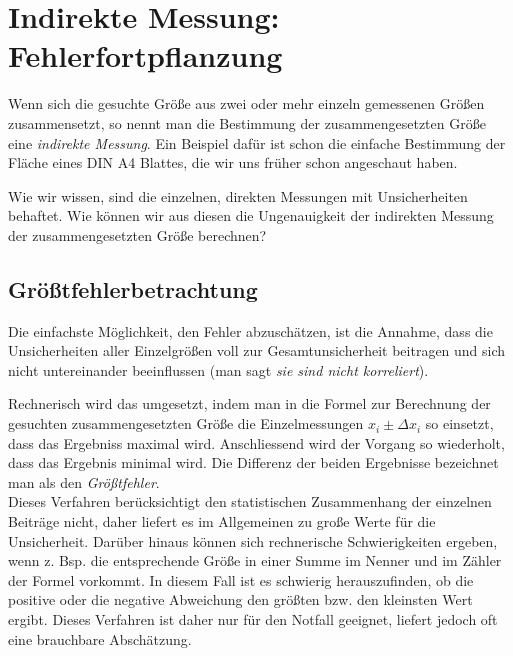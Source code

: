\section{Indirekte Messung: Fehlerfortpflanzung}

Wenn sich die gesuchte Größe aus zwei oder mehr einzeln gemessenen Größen zusammensetzt, so nennt man die Bestimmung der zusammengesetzten Größe eine \textit{indirekte Messung}. Ein Beispiel dafür ist schon die einfache Bestimmung der Fläche eines DIN A4 Blattes, die wir uns früher schon angeschaut haben.

Wie wir wissen, sind die einzelnen, direkten Messungen mit Unsicherheiten behaftet. Wie können wir aus diesen die Ungenauigkeit der indirekten Messung der zusammengesetzten Größe berechnen?

\subsection{Größtfehlerbetrachtung}

Die einfachste Möglichkeit, den Fehler abzuschätzen, ist die Annahme, dass die Unsicherheiten aller Einzelgrößen voll zur Gesamtunsicherheit beitragen und sich nicht untereinander beeinflussen (man sagt \textit{sie sind nicht korreliert}).

Rechnerisch wird das umgesetzt, indem man in die Formel zur Berechnung der gesuchten zusammengesetzten Größe die Einzelmessungen $x_i \pm \Delta x_i$ so einsetzt, dass das Ergebniss maximal wird. Anschliessend wird der Vorgang so wiederholt, dass das Ergebnis minimal wird. Die Differenz der beiden Ergebnisse bezeichnet man als den \textit{Größtfehler}.\\

Dieses Verfahren berücksichtigt den statistischen Zusammenhang der einzelnen Beiträge nicht, daher liefert es im Allgemeinen zu große Werte für die Unsicherheit. Darüber hinaus können sich rechnerische Schwierigkeiten ergeben, wenn z. Bsp. die entsprechende Größe in einer Summe im Nenner und im Zähler der Formel vorkommt. In diesem Fall ist es schwierig herauszufinden, ob die positive oder die negative Abweichung den größten bzw. den kleinsten Wert ergibt. Dieses Verfahren ist daher nur für den Notfall geeignet, liefert jedoch oft eine brauchbare Abschätzung.

